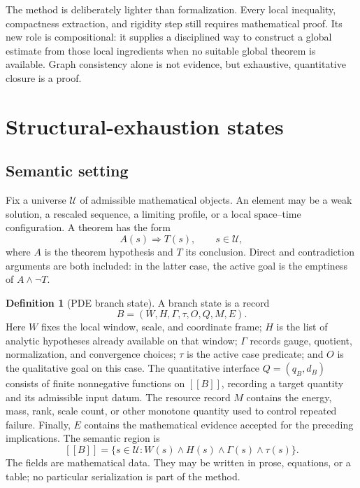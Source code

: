 \documentclass[11pt,reqno]{amsart}
\theoremstyle{plain}
\theoremstyle{definition}
\newtheorem{definition}[definition]{Definition}
\theoremstyle{remark}
\numberwithin{equation}{section}
\newcommand{\calU}{\mathcal U}
\newcommand{\sem}[1]{[\![#1]\!]}
\begin{document}
The method is deliberately lighter than formalization.  Every local inequality,
compactness extraction, and rigidity step still requires mathematical proof.
Its new role is compositional: it supplies a disciplined way to construct a
global estimate from those local ingredients when no suitable global theorem is
available.  Graph consistency alone is not evidence, but exhaustive,
quantitative closure is a proof.

\section{Structural-exhaustion states}
\label{sec:method}

\subsection{Semantic setting}

Fix a universe \(\calU\) of admissible mathematical objects.  An element may
be a weak solution, a rescaled sequence, a limiting profile, or a local
space--time configuration.  A theorem has the form
\begin{equation}\label{eq:target}
  A(s)\Longrightarrow T(s),\qquad s\in\calU,
\end{equation}
where \(A\) is the theorem hypothesis and \(T\) its conclusion.  Direct and
contradiction arguments are both included: in the latter case, the active goal
is the emptiness of \(A\wedge\neg T\).

\begin{definition}[PDE branch state]\label{def:branch-state}
A branch state is a record
\[
  B=(W,H,\Gamma,\tau,O,Q,M,E).
\]
Here \(W\) fixes the local window, scale, and coordinate frame; \(H\) is the
list of analytic hypotheses already available on that window; \(\Gamma\)
records gauge, quotient, normalization, and convergence choices; \(\tau\) is
the active case predicate; and \(O\) is the qualitative goal on this case.
The quantitative interface \(Q=(q_B,d_B)\) consists of finite nonnegative
functions on \(\sem B\), recording a target quantity and its admissible input
datum.  The resource record \(M\) contains the energy, mass,
rank, scale count, or other monotone quantity used to control repeated failure.
Finally, \(E\) contains the mathematical evidence accepted for the preceding
implications.  The semantic region is
\[
  \sem B=\{s\in\calU: W(s)\wedge H(s)\wedge\Gamma(s)\wedge\tau(s)\}.
\]
The fields are mathematical data.  They may be written in prose, equations,
or a table; no particular serialization is part of the method.
\end{definition}
\end{document}
